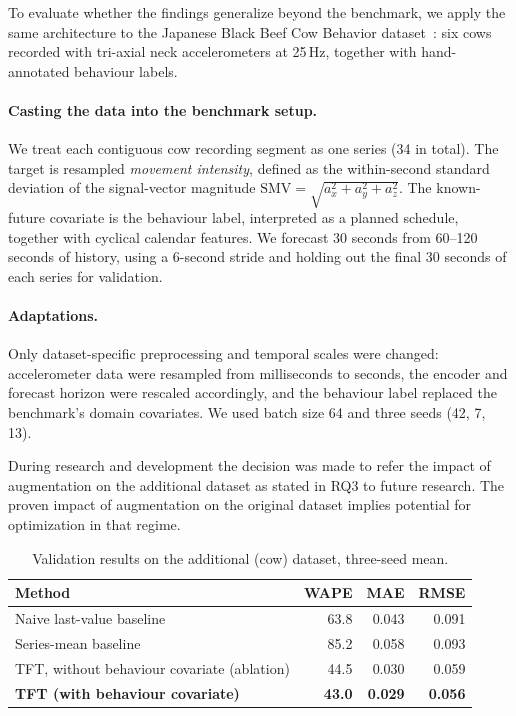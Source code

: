 \documentclass[11pt]{article}
\begin{document}
To evaluate whether the findings generalize beyond the benchmark, we apply the same architecture to
the Japanese Black Beef Cow Behavior dataset~\cite{cowdata}: six cows recorded with tri-axial neck
accelerometers at 25\,Hz, together with hand-annotated behaviour labels.

\paragraph{Casting the data into the benchmark setup.}
We treat each contiguous cow recording segment as one series (34 in total). The target is
resampled \emph{movement intensity}, defined as the within-second standard deviation of the
signal-vector magnitude
$\text{SMV}=\sqrt{a_x^2+a_y^2+a_z^2}$.
The known-future covariate is the behaviour label, interpreted as a planned schedule, together
with cyclical calendar features. We forecast 30 seconds from 60--120 seconds of history, using
a 6-second stride and holding out the final 30 seconds of each series for validation.

\paragraph{Adaptations.}
Only dataset-specific preprocessing and temporal scales were changed: accelerometer data were
resampled from milliseconds to seconds, the encoder and forecast horizon were rescaled accordingly,
and the behaviour label replaced the benchmark's domain covariates. We used batch size 64 and
three seeds (42, 7, 13).

During research and development the decision was made to refer the impact of augmentation on the additional dataset as stated in RQ3 to future research. The proven impact of augmentation on the original dataset implies potential for optimization in that regime.

\begin{table}[h]
\centering
\begin{tabular}{lrrr}
\toprule
Method & WAPE & MAE & RMSE \\
\midrule
Naive last-value baseline & 63.8 & 0.043 & 0.091 \\
Series-mean baseline & 85.2 & 0.058 & 0.093 \\
TFT, without behaviour covariate (ablation) & 44.5 & 0.030 & 0.059 \\
\textbf{TFT (with behaviour covariate)} & \textbf{43.0} & \textbf{0.029} & \textbf{0.056} \\
\bottomrule
\end{tabular}
\caption{Validation results on the additional (cow) dataset, three-seed mean.}
\label{tab:cow}
\end{table}
\end{document}
